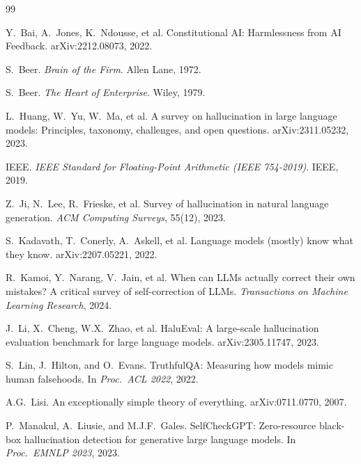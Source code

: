 \documentclass[11pt]{article}
\theoremstyle{definition}
\theoremstyle{remark}
\begin{document}

\begin{thebibliography}{99}

  Y.~Bai, A.~Jones, K.~Ndousse, et al.
  \newblock Constitutional AI: Harmlessness from AI Feedback.
  \newblock arXiv:2212.08073, 2022.

  S.~Beer.
  \newblock \emph{Brain of the Firm}.
  \newblock Allen Lane, 1972.

  S.~Beer.
  \newblock \emph{The Heart of Enterprise}.
  \newblock Wiley, 1979.

  L.~Huang, W.~Yu, W.~Ma, et al.
  \newblock A survey on hallucination in large language models: Principles,
    taxonomy, challenges, and open questions.
  \newblock arXiv:2311.05232, 2023.

  {IEEE}.
  \newblock \emph{IEEE Standard for Floating-Point Arithmetic (IEEE 754-2019)}.
  \newblock IEEE, 2019.

  Z.~Ji, N.~Lee, R.~Frieske, et al.
  \newblock Survey of hallucination in natural language generation.
  \newblock \emph{ACM Computing Surveys}, 55(12), 2023.

  S.~Kadavath, T.~Conerly, A.~Askell, et al.
  \newblock Language models (mostly) know what they know.
  \newblock arXiv:2207.05221, 2022.

  R.~Kamoi, Y.~Narang, V.~Jain, et al.
  \newblock When can LLMs actually correct their own mistakes? A critical survey
    of self-correction of LLMs.
  \newblock \emph{Transactions on Machine Learning Research}, 2024.

  J.~Li, X.~Cheng, W.X.~Zhao, et al.
  \newblock HaluEval: A large-scale hallucination evaluation benchmark for large
    language models.
  \newblock arXiv:2305.11747, 2023.

  S.~Lin, J.~Hilton, and O.~Evans.
  \newblock TruthfulQA: Measuring how models mimic human falsehoods.
  \newblock In \emph{Proc.\ ACL 2022}, 2022.

  A.G.~Lisi.
  \newblock An exceptionally simple theory of everything.
  \newblock arXiv:0711.0770, 2007.

  P.~Manakul, A.~Liusie, and M.J.F.~Gales.
  \newblock SelfCheckGPT: Zero-resource black-box hallucination detection for
    generative large language models.
  \newblock In \emph{Proc.\ EMNLP 2023}, 2023.


\end{thebibliography}
\end{document}
